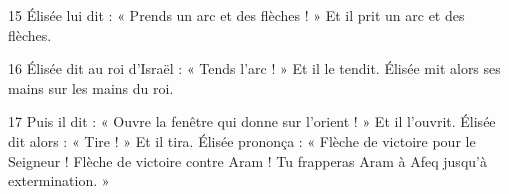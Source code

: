 
15 Élisée lui dit : « Prends un arc et des flèches ! » Et il prit un arc et des flèches.

16 Élisée dit au roi d’Israël : « Tends l’arc ! » Et il le tendit. Élisée mit alors ses mains sur les mains du roi.

17 Puis il dit : « Ouvre la fenêtre qui donne sur l’orient ! » Et il l’ouvrit. Élisée dit alors : « Tire ! » Et il tira. Élisée prononça : « Flèche de victoire pour le Seigneur ! Flèche de victoire contre Aram ! Tu frapperas Aram à Afeq jusqu’à extermination. »
